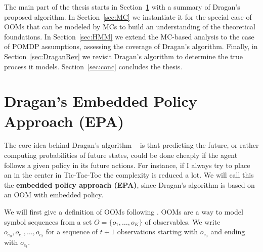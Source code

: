 \documentclass{article}
\theoremstyle{definition}
\def\ticX{\text{${\times}$}}
\begin{document}
\bigskip The main part of the thesis starts in Section~\ref {sec:Dragan} with a summary of
Dragan's proposed algorithm. In Section~\ref{sec:MC} we instantiate it for the special
case of OOMs that can be modeled by MCs to build an understanding of the theoretical
foundations. In Section~\ref{sec:HMM} we extend the MC-based analysis to the case of POMDP
assumptions, assessing the coverage of Dragan's algorithm. Finally, in
Section~\ref{sec:DraganRev} we revisit Dragan's algorithm to determine the true process it
models. Section~\ref{sec:conc} concludes the thesis.




\section{Dragan's Embedded Policy Approach (EPA)}\label{sec:Dragan}
The core idea behind Dragan's algorithm ~\cite{Anca} is that predicting the future, or rather computing probabilities of future states, could be done cheaply if the agent follows a given policy in its future actions. For instance, if I always try to place an {\ticX} in the center in Tic-Tac-Toe the complexity is reduced a lot. We will call this the {\bf{embedded policy approach (EPA)}}, since Dragan's algorithm is based on an OOM with embedded policy.

We will first give a definition of OOMs following \cite{OOM1}. 
OOMs are a way to model symbol sequences from a set $O=\{o_1,\ldots,o_K\}$ of observables. We write $o_{e_0},o_{e_1},\ldots,o_{e_{t}}$ for a sequence of $t+1$ observations starting with $o_{e_0}$ and ending with $o_{e_{t}}$. 
\end{document}
